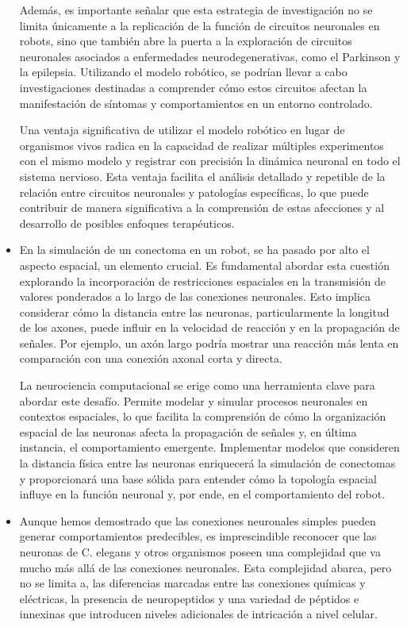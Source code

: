 \begin{itemize}
Además, es importante señalar que esta estrategia de investigación no se limita únicamente a la replicación de la función de circuitos neuronales en robots, sino que también abre la puerta a la exploración de circuitos neuronales asociados a enfermedades neurodegenerativas, como el Parkinson y la epilepsia. Utilizando el modelo robótico, se podrían llevar a cabo investigaciones destinadas a comprender cómo estos circuitos afectan la manifestación de síntomas y comportamientos en un entorno controlado.

Una ventaja significativa de utilizar el modelo robótico en lugar de organismos vivos radica en la capacidad de realizar múltiples experimentos con el mismo modelo y registrar con precisión la dinámica neuronal en todo el sistema nervioso. Esta ventaja facilita el análisis detallado y repetible de la relación entre circuitos neuronales y patologías específicas, lo que puede contribuir de manera significativa a la comprensión de estas afecciones y al desarrollo de posibles enfoques terapéuticos.

\item En la simulación de un conectoma en un robot, se ha pasado por alto el aspecto espacial, un elemento crucial. Es fundamental abordar esta cuestión explorando la incorporación de restricciones espaciales en la transmisión de valores ponderados a lo largo de las conexiones neuronales. Esto implica considerar cómo la distancia entre las neuronas, particularmente la longitud de los axones, puede influir en la velocidad de reacción y en la propagación de señales. Por ejemplo, un axón largo podría mostrar una reacción más lenta en comparación con una conexión axonal corta y directa.

La neurociencia computacional se erige como una herramienta clave para abordar este desafío. Permite modelar y simular procesos neuronales en contextos espaciales, lo que facilita la comprensión de cómo la organización espacial de las neuronas afecta la propagación de señales y, en última instancia, el comportamiento emergente. Implementar modelos que consideren la distancia física entre las neuronas enriquecerá la simulación de conectomas y proporcionará una base sólida para entender cómo la topología espacial influye en la función neuronal y, por ende, en el comportamiento del robot.

\item Aunque hemos demostrado que las conexiones neuronales simples pueden generar comportamientos predecibles, es imprescindible reconocer que las neuronas de C. elegans y otros organismos poseen una complejidad que va mucho más allá de las conexiones neuronales. Esta complejidad abarca, pero no se limita a, las diferencias marcadas entre las conexiones químicas y eléctricas, la presencia de neuropeptidos y una variedad de péptidos e innexinas que introducen niveles adicionales de intricación a nivel celular.


\end{itemize}

